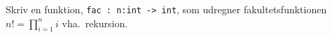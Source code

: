 Skriv en funktion, \lstinline{fac : n:int -> int}, som udregner fakultetsfunktionen $n! = \prod_{i=1}^ni$ vha.\ rekursion.
